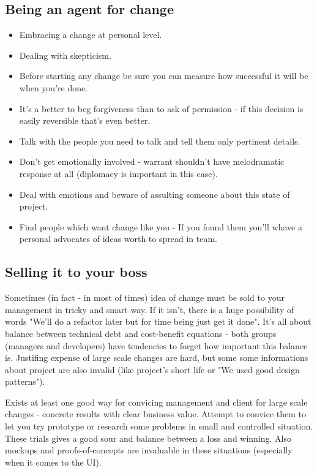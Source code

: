 \documentclass[11pt,a4paper]{article}
\begin{document}
\subsection{Being an agent for change}
\begin{itemize}
	\item Embracing a change at personal level.
	\item Dealing with skepticism.
	\item Before starting any change be sure you can measure how successful it will be when you're done.
	\item It's a better to beg forgiveness than to ask of permission - if this decision is easily reversible that's even better.
	\item Talk with the people you need to talk and tell them only pertinent details.
	\item Don't get emotionally involved - warrant shouldn't have melodramatic response at all (diplomacy is important in this case).
	\item Deal with emotions and beware of assulting someone about this state of project.
	\item Find people which want change like you - If you found them you'll whave a personal advocates of ideas worth to spread in team.
\end{itemize}

\subsection{Selling it to your boss}
Sometimes (in fact - in most of times) idea of change must be sold to your management in tricky and smart way. If it isn't, there is a huge possibility of words "We'll do a refactor later but for time being just get it done". It's all about balance between technical debt and cost-benefit equations - both groups (managers and developers) have tendencies to forget how important this balance is. Justifing expense of large scale changes are hard, but some some informations about project are also invalid (like project's short life or "We used good design patterns").

Exists at least one good way for convicing management and client for large scale changes - concrete results with clear business value. Attempt to convice them to let you try prototype or research some problems in small and controlled situation. These trials gives a good sour and balance between a loss and winning. Also mockups and proofs-of-concepts are invaluable in these situations (especially when it comes to the UI).
\end{document}
